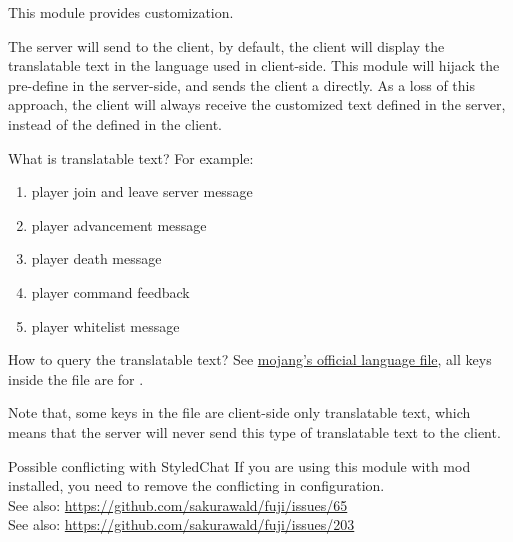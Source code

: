 
This module provides  customization.

The server will send  to the client, by default, the client will display the translatable text in the language used in client-side.
This module will hijack the pre-define  in the server-side, and sends the client a  directly.
As a loss of this approach, the client will always receive the customized text defined in the server, instead of the  defined in the client.

\begin{note}{What is translatable text?}
    For example:
    \begin{enumerate}
        \item player join and leave server message
        \item player advancement message
        \item player death message
        \item player command feedback
        \item player whitelist message
    \end{enumerate}
\end{note}

\begin{note}{How to query the translatable text?}
    See \href{https://github.com/sakurawald/fuji/blob/dev/.github/files/en_us.json}{mojang's official language file}, all keys inside the file are for .

    Note that, some keys in the file are client-side only translatable text, which means that the server will never send this type of translatable text to the client.
\end{note}

\begin{warn}{Possible conflicting with StyledChat}
    If you are using this module with  mod installed, you need to remove the conflicting  in  configuration. \\
    See also: \url{https://github.com/sakurawald/fuji/issues/65}\\
    See also: \url{https://github.com/sakurawald/fuji/issues/203}\\
\end{warn}


